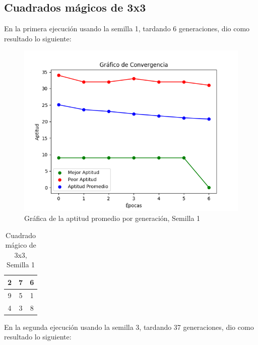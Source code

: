 \documentclass{report}
\begin{document}
    \subsection{Cuadrados mágicos de 3x3}
    En la primera ejecución usando la semilla 1, tardando 6 generaciones, dio como resultado lo siguiente:
    \begin{figure}[H]
        \centering
        \includegraphics[scale=0.5]{Grafica1.png}
        \caption{Gráfica de la aptitud promedio por generación, Semilla 1}
    \end{figure}
    \begin{table}[H]
        \centering
        \begin{tabular}{|c|c|c|}
            \hline
            2 & 7 & 6\\
            \hline
            9 & 5 & 1\\
            \hline
            4 & 3 & 8\\
            \hline
        \end{tabular}
        \caption{Cuadrado mágico de 3x3, Semilla 1}
    \end{table}
    En la segunda ejecución usando la semilla 3, tardando 37 generaciones, dio como resultado lo siguiente:
\end{document}
